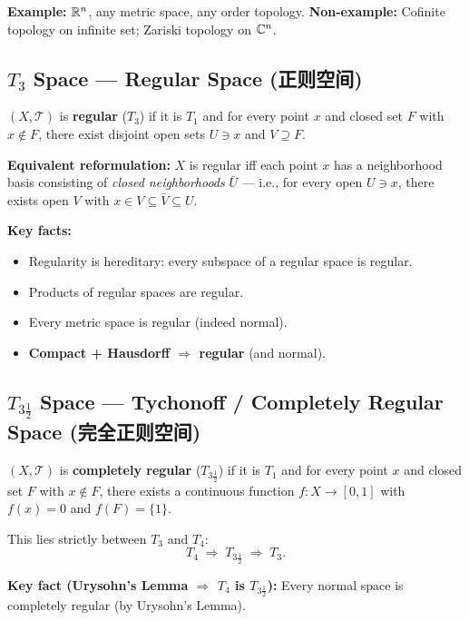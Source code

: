 \documentclass{article}
\begin{document}
\textbf{Example:} $\mathbb{R}^n$, any metric space, any order topology.
\textbf{Non-example:} Cofinite topology on infinite set; Zariski
topology on $\mathbb{C}^n$.

\subsection{$T_3$ Space --- Regular Space (正则空间)}\label{def:T3}
\begin{definition}
  $(X, \mathcal{T})$ is \textbf{regular} ($T_3$) if it is $T_1$ and for
  every point $x$ and closed set $F$ with $x \notin F$, there exist
  disjoint open sets $U \ni x$ and $V \supseteq F$.
\end{definition}

\textbf{Equivalent reformulation:} $X$ is regular iff each point $x$ has
a neighborhood basis consisting of \emph{closed neighborhoods}
$\bar{U}$ --- i.e., for every open $U \ni x$, there exists open $V$ with
$x \in V \subseteq \bar{V} \subseteq U$.

\textbf{Key facts:}
\begin{itemize}
  \item Regularity is hereditary: every subspace of a regular space is regular.
  \item Products of regular spaces are regular.
  \item Every metric space is regular (indeed normal).
  \item \textbf{Compact + Hausdorff $\Rightarrow$ regular} (and normal).
\end{itemize}

\subsection{$T_{3\frac{1}{2}}$ Space --- Tychonoff / Completely Regular Space
(完全正则空间)}\label{def:T3h}
\begin{definition}
  $(X, \mathcal{T})$ is \textbf{completely regular} ($T_{3\frac{1}{2}}$)
  if it is $T_1$ and for every point $x$ and closed set $F$ with $x \notin F$,
  there exists a continuous function $f : X \to [0,1]$ with $f(x) = 0$
  and $f(F) = \{1\}$.
\end{definition}

This lies strictly between $T_3$ and $T_4$:
\[ T_4 \;\Rightarrow\; T_{3\frac{1}{2}} \;\Rightarrow\; T_3. \]

\textbf{Key fact (Urysohn's Lemma $\Rightarrow$ $T_4$ is $T_{3\frac{1}{2}}$):}
Every normal space is completely regular (by Urysohn's Lemma).
\end{document}
